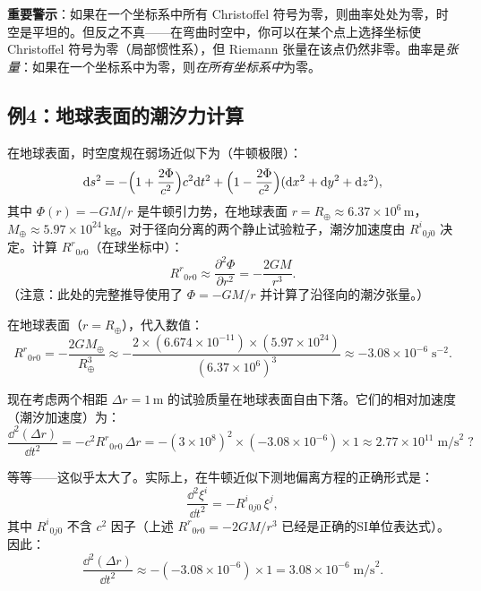 \textbf{重要警示}：如果在一个坐标系中所有 Christoffel 符号为零，则曲率处处为零，时空是平坦的。但反之不真——在弯曲时空中，你可以在某个点上选择坐标使 Christoffel 符号为零（局部惯性系），但 Riemann 张量在该点仍然非零。曲率是\emph{张量}：如果在一个坐标系中为零，则\emph{在所有坐标系中}为零。

\subsection{例4：地球表面的潮汐力计算}

在地球表面，时空度规在弱场近似下为（牛顿极限）：
\begin{equation}
    \dd s^2 = -\Bigl(1 + \frac{2\Phi}{c^2}\Bigr) c^2 \dd t^2 + \Bigl(1 - \frac{2\Phi}{c^2}\Bigr)(\dd x^2 + \dd y^2 + \dd z^2),
\end{equation}
其中 $\Phi(r) = -GM/r$ 是牛顿引力势，在地球表面 $r = R_\oplus \approx 6.37 \times 10^6\,\text{m}$，$M_\oplus \approx 5.97 \times 10^{24}\,\text{kg}$。对于径向分离的两个静止试验粒子，潮汐加速度由 $R^i{}_{0j0}$ 决定。计算 $R^r{}_{0r0}$（在球坐标中）：
\begin{equation}
    R^r{}_{0r0} \approx \frac{\partial^2 \Phi}{\partial r^2} = -\frac{2GM}{r^3}.
\end{equation}
（注意：此处的完整推导使用了 $\Phi = -GM/r$ 并计算了沿径向的潮汐张量。）

在地球表面（$r = R_\oplus$），代入数值：
\begin{equation}
    R^r{}_{0r0} = -\frac{2GM_\oplus}{R_\oplus^3} \approx -\frac{2 \times (6.674 \times 10^{-11}) \times (5.97 \times 10^{24})}{(6.37 \times 10^6)^3} \approx -3.08 \times 10^{-6} \;\text{s}^{-2}.
\end{equation}

现在考虑两个相距 $\Delta r = 1\,\text{m}$ 的试验质量在地球表面自由下落。它们的相对加速度（潮汐加速度）为：
\begin{equation}
    \frac{\dd^2 (\Delta r)}{\dd t^2} = -c^2 R^r{}_{0r0}\, \Delta r = -(3 \times 10^8)^2 \times (-3.08 \times 10^{-6}) \times 1 \approx 2.77 \times 10^{11} \;\text{m/s}^2 \;?
\end{equation}

等等——这似乎太大了。实际上，在牛顿近似下测地偏离方程的正确形式是：
\begin{equation}
    \frac{\dd^2 \xi^i}{\dd t^2} = -R^i{}_{0j0}\, \xi^j,
\end{equation}
其中 $R^i{}_{0j0}$ 不含 $c^2$ 因子（上述 $R^r{}_{0r0} = -2GM/r^3$ 已经是正确的SI单位表达式）。因此：
\begin{equation}
    \frac{\dd^2 (\Delta r)}{\dd t^2} \approx -(-3.08 \times 10^{-6}) \times 1 = 3.08 \times 10^{-6} \;\text{m/s}^2.
\end{equation}

